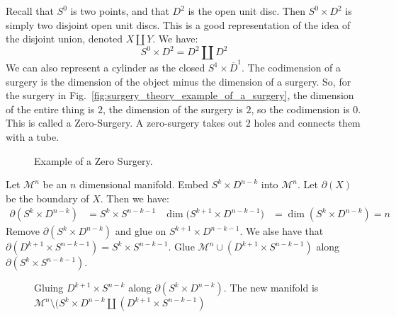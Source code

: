             Recall that $S^{0}$ is two points, and that
            $D^{2}$ is the open unit disc. Then $S^{0}\times D^{2}$
            is simply two disjoint open unit discs. This is a good
            representation of the idea of the disjoint union,
            denoted $X\coprod Y$. We have:
            \begin{equation*}
                S^{0}\times{D^{2}}=D^{2}\coprod{D^{2}}
            \end{equation*}
            We can also represent a cylinder as the closed
            $S^{1}\times \overline{D}^{1}$. The codimension
            of a surgery is the dimension of the object minus
            the dimension of a surgery. So, for the surgery
            in Fig.~\ref{fig:surgery_theory_example_of_a_surgery},
            the dimension of the entire thing is $2$, the dimension
            of the surgery is $2$, so the codimension is $0$.
            This is called a Zero-Surgery. A zero-surgery takes
            out $2$ holes and connects them with a tube.
            \begin{figure}[H]
                \centering
                \captionsetup{type=figure}
                
                \caption{Example of a Zero Surgery.}
                \label{fig:surgery_theory_a_zero_surgery}
            \end{figure}
            Let $\mathcal{M}^{n}$ be an $n$ dimensional manifold.
            Embed
            $S^{k}\times D^{n-k}$ into $\mathcal{M}^{n}$.
            Let $\partial(X)$ be the boundary of $X$.
            Then we have:
            \begin{align*}
                \partial(S^{k}\times {D^{n-k}})
                &=S^{k}\times{S^{n-k-1}}
                &
                \dim(S^{k+1}\times{D^{n-k-1})}
                &=\dim(S^{k}\times{D^{n-k}})=n
            \end{align*}
            Remove $\partial(S^{k}\times{D^{n-k}})$ and glue on
            $S^{k+1}\times{D}^{n-k-1}$. We alse have that
            $\partial(D^{k+1}\times{S^{n-k-1}})=S^{k}\times{S^{n-k-1}}$.
            Glue $\mathcal{M}^{n}\cup(D^{k+1}\times S^{n-k-1})$
            along $\partial(S^{k}\times{S^{n-k-1}})$.
            \begin{figure}[H]
                \centering
                \captionsetup{type=figure}
                
                \caption[More Complicated Surgery Example.]
                        {Gluing $D^{k+1}\times S^{n-k}$ along
                         $\partial(S^{k}\times D^{n-k})$. The new manifold is
                         $\mathcal{M}^{n}\setminus(S^{k}\times%
                          D^{n-k}\coprod(D^{k+1}\times S^{n-k-1})$}
                \label{fig:surgery_theory_glueing_S_k_D_n_k_to_M}
            \end{figure}
